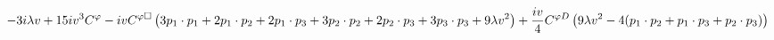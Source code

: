 %
\begin{dmath*}
%
  -  3 i \lambda v   +  15 i v^3C^{\varphi }  -  i vC^{ \varphi  \Box} \left(3 p_{1}\nobreak\cdot\nobreak{}p_{1} + 2 p_{1}\nobreak\cdot\nobreak{}p_{2} + 2 p_{1}\nobreak\cdot\nobreak{}p_{3} + 3 p_{2}\nobreak\cdot\nobreak{}p_{2} + 2 p_{2}\nobreak\cdot\nobreak{}p_{3} + 3 p_{3}\nobreak\cdot\nobreak{}p_{3} + 9 \lambda v^2\right)  +  \frac{i v}{4}C^{ \varphi  D} \left(9 \lambda v^2 - 4 (p_{1}\nobreak\cdot\nobreak{}p_{2} + p_{1}\nobreak\cdot\nobreak{}p_{3} + p_{2}\nobreak\cdot\nobreak{}p_{3})\right)
%
\end{dmath*}
%
